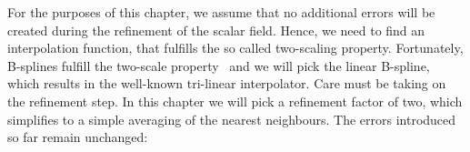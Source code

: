 
For the purposes of this chapter, we assume that no additional 
errors will be created during the refinement of the scalar field. 
Hence, we need to find an interpolation function, that fulfills the 
so called two-scaling property. Fortunately, B-splines fulfill the 
two-scale property~\cite{799930} and we will pick the linear B-spline, 
which results in the well-known tri-linear interpolator. Care must 
be taking on the refinement step. In this chapter we will pick a 
refinement factor of two, which simplifies to a simple averaging of 
the nearest neighbours. The errors introduced so far remain 
unchanged:

